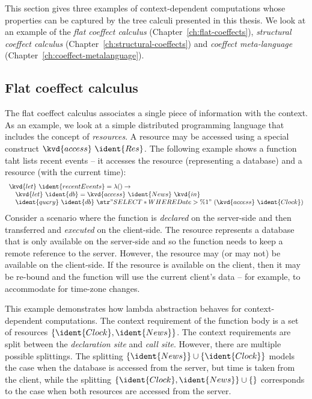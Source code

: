 This section gives three examples of context-dependent computations whose properties can be captured
by the tree calculi presented in this thesis. We look at an example of the \emph{flat coeffect calculus} 
(Chapter~\ref{ch:flat-coeffects}), \emph{structural coeffect calculus} (Chapter~\ref{ch:structural-coeffects})
and \emph{coeffect meta-language} (Chapter~\ref{ch:coeffect-metalanguage}).


\subsection{Flat coeffect calculus}

The flat coeffect calculus associates a single piece of information with the context. As an example,
we look at a simple distributed programming language that includes the concept of \emph{resources}.
A resource may be accessed using a special construct $\kvd{access}~\ident{Res}$. The following 
example shows a function taht lists recent events -- it accesses the resource  
(representing a database) and a resource  (with the current time):
%
\begin{equation*}
\begin{array}{l}
\kvd{let}~\ident{recentEvents} = \lambda () \rightarrow\\
\quad\kvd{let}~\ident{db} = \kvd{access}~\ident{News}~\kvd{in}\\
\quad\ident{query}~\ident{db}~\str{"SELECT * WHERE Date > \%1"}~(\kvd{access}~\ident{Clock})
\end{array}
\end{equation*}
%
Consider a scenario where the function is \emph{declared} on the server-side and then
transferred and \emph{executed} on the client-side. The resource  represents a 
database that is only available on the server-side and so the function needs to keep a remote
reference to the server. However, the  resource may (or may not) be available on the
client-side. If the resource is available on the client, then it may be re-bound and the function
will use the current client's data -- for example, to accommodate for time-zone changes.

This example demonstrates how lambda abstraction behaves for context-dependent computations. The 
context requirement of the function body is a set of resources $\{\ident{Clock}, \ident{News}\}$.
The context requirements are split between the \emph{declaration site} and \emph{call site}.
However, there are multiple possible splittings. The splitting $\{\ident{News}\} \cup \{\ident{Clock}\}$
models the case when the database is accessed from the server, but time is taken from the client,
while the splitting $\{\ident{Clock}, \ident{News}\} \cup \{\}$ corresponds to the case when both
resources are accessed from the server.

